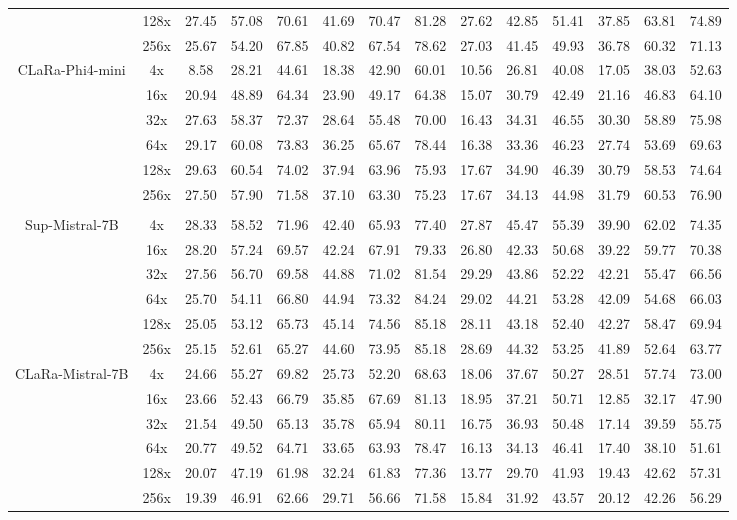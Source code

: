 \documentclass{applemlr}
\numberwithin{equation}{section}
\begin{document}
\begin{table}[!htbp]
\begin{tabular}{c|c|ccc|ccc|ccc|ccc}
 & 128x & 27.45 & 57.08 & 70.61 & 41.69 & 70.47 & 81.28 & 27.62 & 42.85 & 51.41 & 37.85 & 63.81 & 74.89 \\
 & 256x & 25.67 & 54.20 & 67.85 & 40.82 & 67.54 & 78.62 & 27.03 & 41.45 & 49.93 & 36.78 & 60.32 & 71.13 \\
\cline{2-14}
\multirow{6}{*}{CLaRa-Phi4-mini} & 4x & 8.58 & 28.21 & 44.61 & 18.38 & 42.90 & 60.01 & 10.56 & 26.81 & 40.08 & 17.05 & 38.03 & 52.63  \\
 & 16x & 20.94 & 48.89 & 64.34 & 23.90 & 49.17 & 64.38 & 15.07 & 30.79 & 42.49 & 21.16 & 46.83 & 64.10  \\
 & 32x & 27.63 & 58.37 & 72.37 & 28.64 & 55.48 & 70.00 & 16.43 & 34.31 & 46.55 & 30.30 & 58.89 & 75.98 \\
 & 64x & 29.17 & 60.08 & 73.83 & 36.25 & 65.67 & 78.44 & 16.38 & 33.36 & 46.23 & 27.74 & 53.69 & 69.63\\
 & 128x & 29.63 & 60.54 & 74.02 & 37.94 & 63.96 & 75.93 & 17.67 & 34.90 & 46.39 & 30.79 & 58.53 & 74.64 \\
 & 256x & 27.50 & 57.90 & 71.58 & 37.10 & 63.30 & 75.23 & 17.67 & 34.13 & 44.98 & 31.79 & 60.53 & 76.90\\

\hline
\rowcolor{gray!15}
\multicolumn{14}{c}{\textbf{Instruction-tuned-initialized}} \\
\multirow{6}{*}{Sup-Mistral-7B }& 4x & 28.33 & 58.52 & 71.96 & 42.40 & 65.93 & 77.40 & 27.87 & 45.47 & 55.39 & 39.90 & 62.02 & 74.35  \\
 & 16x & 28.20 & 57.24 & 69.57 & 42.24 & 67.91 & 79.33 & 26.80 & 42.33 & 50.68 & 39.22 & 59.77 & 70.38  \\
 & 32x & 27.56 & 56.70 & 69.58 & 44.88 & 71.02 & 81.54 & 29.29 & 43.86 & 52.22 & 42.21 & 55.47 & 66.56\\
 & 64x & 25.70 & 54.11 & 66.80 & 44.94 & 73.32 & 84.24 & 29.02 & 44.21 & 53.28 & 42.09 & 54.68 & 66.03\\
 & 128x & 25.05 & 53.12 & 65.73 & 45.14 & 74.56 & 85.18 & 28.11 & 43.18 & 52.40 & 42.27 & 58.47 & 69.94\\
 & 256x & 25.15 & 52.61 & 65.27 & 44.60 & 73.95 & 85.18 & 28.69 & 44.32 & 53.25 & 41.89 & 52.64 & 63.77\\
 \cline{2-14}

\multirow{6}{*}{CLaRa-Mistral-7B} & 4x & 24.66 & 55.27 & 69.82 & 25.73 & 52.20 & 68.63 & 18.06 & 37.67 & 50.27 & 28.51 & 57.74 & 73.00  \\
 & 16x & 23.66 & 52.43 & 66.79 & 35.85 & 67.69 & 81.13 & 18.95 & 37.21 & 50.71 & 12.85 & 32.17 & 47.90 \\
 & 32x & 21.54 & 49.50 & 65.13 & 35.78 & 65.94 & 80.11 & 16.75 & 36.93 & 50.48 & 17.14 & 39.59 & 55.75 \\
 & 64x & 20.77 & 49.52 & 64.71 & 33.65 & 63.93 & 78.47 & 16.13 & 34.13 & 46.41 & 17.40 & 38.10 & 51.61\\
 & 128x & 20.07 & 47.19 & 61.98 & 32.24 & 61.83 & 77.36 & 13.77 & 29.70 & 41.93 & 19.43 & 42.62 & 57.31 \\
 & 256x & 19.39 & 46.91 & 62.66 & 29.71 & 56.66 & 71.58 & 15.84 & 31.92 & 43.57 & 20.12 & 42.26 & 56.29  \\
 \cline{2-14}


\end{tabular}
\end{table}
\end{document}
